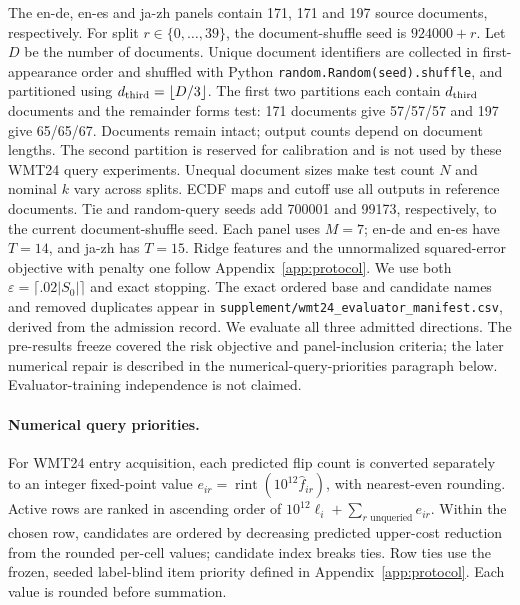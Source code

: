 The en-de, en-es and ja-zh panels contain 171, 171 and 197 source documents, respectively. For split $r\in\{0,\ldots,39\}$, the document-shuffle seed is $924000+r$. Let $D$ be the number of documents. Unique document identifiers are collected in first-appearance order and shuffled with Python \texttt{random.Random(seed).shuffle}, and partitioned using $d_{\rm third}=\lfloor D/3\rfloor$. The first two partitions each contain $d_{\rm third}$ documents and the remainder forms test: 171 documents give 57/57/57 and 197 give 65/65/67. Documents remain intact; output counts depend on document lengths. The second partition is reserved for calibration and is not used by these WMT24 query experiments. Unequal document sizes make test count $N$ and nominal $k$ vary across splits. ECDF maps and cutoff use all outputs in reference documents. Tie and random-query seeds add 700001 and 99173, respectively, to the current document-shuffle seed. Each panel uses $M=7$; en-de and en-es have $T=14$, and ja-zh has $T=15$. Ridge features and the unnormalized squared-error objective with penalty one follow Appendix~\ref{app:protocol}. We use both $\varepsilon=\lceil.02|S_0|\rceil$ and exact stopping. The exact ordered base and candidate names and removed duplicates appear in \nolinkurl{supplement/wmt24_evaluator_manifest.csv}, derived from the admission record. We evaluate all three admitted directions. The pre-results freeze covered the risk objective and panel-inclusion criteria; the later numerical repair is described in the numerical-query-priorities paragraph below. Evaluator-training independence is not claimed.

\paragraph{Numerical query priorities.}
\label{app:wmt24-priority-repair}
For WMT24 entry acquisition, each predicted flip count is converted separately to an integer fixed-point value $e_{ir}=\operatorname{rint}(10^{12}\hat f_{ir})$, with nearest-even rounding. Active rows are ranked in ascending order of $10^{12}\ell_i+\sum_{r\text{ unqueried}}e_{ir}$. Within the chosen row, candidates are ordered by decreasing predicted upper-cost reduction from the rounded per-cell values; candidate index breaks ties. Row ties use the frozen, seeded label-blind item priority defined in Appendix~\ref{app:protocol}. Each value is rounded before summation. 

